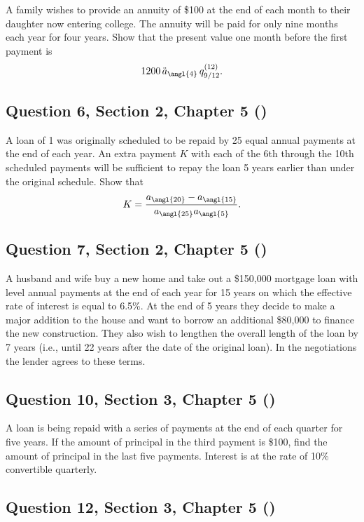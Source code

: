 \documentclass[12pt, a4paper]{article}
\begin{document}
\noindent A family wishes to provide an annuity of \$100 at the end of each month to their daughter now entering college. The annuity will be paid for only nine months each year for four years. Show that the present value one month before the first payment is
\[
1200 \, \ddot{a}_{\angl{4}} \, q^{(12)}_{9/12}.
\]

\subsection*{Question 6, Section 2, Chapter 5  (\cite{toi3rd})}

\noindent A loan of 1 was originally scheduled to be repaid by 25 equal annual payments at the end of each year. An extra payment \( K \) with each of the 6th through the 10th scheduled payments will be sufficient to repay the loan 5 years earlier than under the original schedule. Show that
\[
K = \frac{a_{\angl{20}} - a_{\angl{15}}}{a_{\angl{25}} a_{\angl{5}}}.
\]

\subsection*{Question 7, Section 2, Chapter 5  (\cite{toi3rd})}

\noindent A husband and wife buy a new home and take out a \$150{,}000 mortgage loan with level annual payments at the end of each year for 15 years on which the effective rate of interest is equal to 6.5\%. At the end of 5 years they decide to make a major addition to the house and want to borrow an additional \$80{,}000 to finance the new construction. They also wish to lengthen the overall length of the loan by 7 years (i.e., until 22 years after the date of the original loan). In the negotiations the lender agrees to these terms.

\subsection*{Question 10, Section 3, Chapter 5  (\cite{toi3rd})}

\noindent A loan is being repaid with a series of payments at the end of each quarter for five years. If the amount of principal in the third payment is \$100, find the amount of principal in the last five payments. Interest is at the rate of 10\% convertible quarterly.

\subsection*{Question 12, Section 3, Chapter 5  (\cite{toi3rd})}
\end{document}
